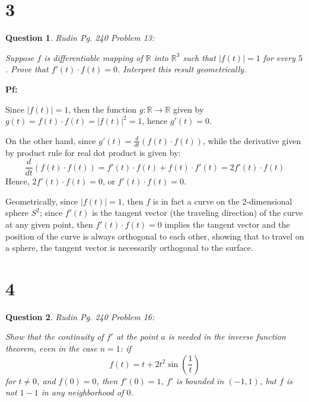 \documentclass{article}
\newtheorem{question}{Question}
\begin{document}
\hfil

\hfil

\section*{3}
\begin{myBox}[]{}
    \begin{question}
        Rudin Pg. 240 Problem 13:

        Suppose $f$ is differentiable mapping of $\mathbb{R}$ into $\mathbb{R}^3$ such that $|f(t)|=1$ for every $5$.
        Prove that $f'(t)\cdot f(t)=0$. Interpret this result geometrically.
    \end{question}
\end{myBox}

\textbf{Pf:}

Since $|f(t)|=1$, then the function $g:\mathbb{R}\rightarrow\mathbb{R}$ given by $g(t)=f(t)\cdot f(t)=|f(t)|^2 = 1$, hence $g'(t)=0$.

On the other hand, since $g'(t) = \frac{d}{dt}(f(t)\cdot f(t))$, while the derivative given by product rule for real dot product is given by:
$$\frac{d}{dt}(f(t)\cdot f(t)) = f'(t)\cdot f(t) + f(t)\cdot f'(t) = 2f'(t)\cdot f(t)$$
Hence, $2f'(t)\cdot f(t)=0$, or $f'(t)\cdot f(t)=0$.

Geometrically, since $|f(t)|=1$, then $f$ is in fact a curve on the 2-dimensional sphere $S^2$; since $f'(t)$ is the tangent vector (the traveling direction) of the curve at any given point,
then $f'(t)\cdot f(t)=0$ implies the tangent vector and the position of the curve is always orthogonal to each other, showing that to travel on a sphere, the tangent vector is necessarily orthogonal to the surface.

\break

\section*{4}
\begin{myBox}[]{}
    \begin{question}
        Rudin Pg. 240 Problem 16:

        Show that the continuity of $f'$ at the point $a$ is needed in the inverse function theorem, even in the case $n=1$: if
        $$f(t)=t+2t^2\sin\left(\frac{1}{t}\right)$$
        for $t\neq 0$, and $f(0)=0$, then $f'(0)=1$, $f'$ is bounded in $(-1,1)$, but $f$ is not $1-1$ in any neighborhood of $0$.
    \end{question}
\end{myBox}
\end{document}
